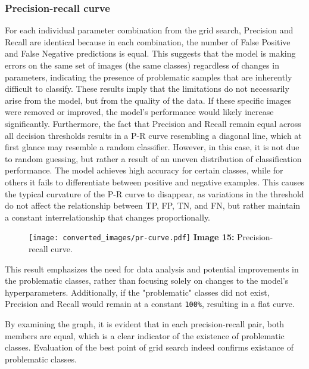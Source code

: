 \documentclass{article}
\begin{document}
\subsubsection*{Precision-recall curve}
\hspace*{1.00cm}For each individual parameter combination from the grid search, Precision and Recall are identical because in each combination, the number of False Positive and False Negative predictions is equal. This suggests that the model is making errors on the same set of images (the same classes) regardless of changes in parameters, indicating the presence of problematic samples that are inherently difficult to classify. These results imply that the limitations do not necessarily arise from the model, but from the quality of the data. If these specific images were removed or improved, the model's performance would likely increase significantly.
Furthermore, the fact that Precision and Recall remain equal across all decision thresholds results in a P-R curve\cite{v7labs_precision_recall} resembling a diagonal line, which at first glance may resemble a random classifier. However, in this case, it is not due to random guessing, but rather a result of an uneven distribution of classification performance. The model achieves high accuracy for certain classes, while for others it fails to differentiate between positive and negative examples. This causes the typical curvature of the P-R curve to disappear, as variations in the threshold do not affect the relationship between TP, FP, TN, and FN, but rather maintain a constant interrelationship that changes proportionally. 

\begin{figure}[H]
    \centering
    \texttt{[image: converted\_images/pr-curve.pdf]}
    \textbf{Image 15:} Precision-recall curve.
\end{figure}

\hspace*{1.00cm} This result emphasizes the need for data analysis and potential improvements in the problematic classes, rather than focusing solely on changes to the model's hyperparameters. Additionally, if the "problematic" classes did not exist, Precision and Recall would remain at a constant \texttt{100\%}, resulting in a flat curve.

\hspace*{1.00cm}By examining the graph, it is evident that in each precision-recall pair, both members are equal, which is a clear indicator of the existence of problematic classes.
Evaluation of the best point of grid search indeed confirms existance of problematic classes.
\end{document}
